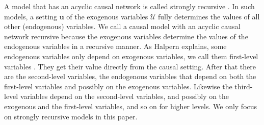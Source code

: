 A model that has an acyclic causal network is called strongly recursive \cite{halpern2016actual}. In such models, a setting $\mathbf{u}$ of the exogenous variables $\mathcal{U}$ fully determines the values of all other (endogenous) variables. We call a causal model with an acyclic causal network recursive because the exogenous variables determine the values of the endogenous variables in a recursive manner. 
As Halpern explains, some endogenous variables only depend on exogenous variables, we call them first-level variables \cite{halpern2016actual}. 
They get their value directly from the causal setting.
After that there are the second-level variables, the endogenous variables that depend on both the first-level variables and possibly on the exogenous variables.
Likewise the third-level variables depend on the second-level variables, and possibly on the exogenous and the first-level variables, and so on for higher levels.
We only focus on strongly recursive models in this paper.


